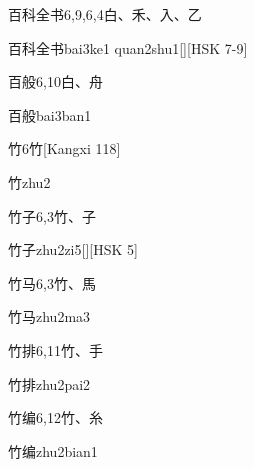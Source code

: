\begin{Entry}{百科全书}{6,9,6,4}{⽩、⽲、⼊、⼄}
  \begin{Phonetics}{百科全书}{bai3ke1 quan2shu1}[][HSK 7-9]
  \end{Phonetics}
\end{Entry}

\begin{Entry}{百般}{6,10}{⽩、⾈}
  \begin{Phonetics}{百般}{bai3ban1}
  \end{Phonetics}
\end{Entry}

\begin{Entry}{竹}{6}{⽵}[Kangxi 118]
  \begin{Phonetics}{竹}{zhu2}
  \end{Phonetics}
\end{Entry}

\begin{Entry}{竹子}{6,3}{⽵、⼦}
  \begin{Phonetics}{竹子}{zhu2zi5}[][HSK 5]
  \end{Phonetics}
\end{Entry}

\begin{Entry}{竹马}{6,3}{⽵、⾺}
  \begin{Phonetics}{竹马}{zhu2ma3}
  \end{Phonetics}
\end{Entry}

\begin{Entry}{竹排}{6,11}{⽵、⼿}
  \begin{Phonetics}{竹排}{zhu2pai2}
  \end{Phonetics}
\end{Entry}

\begin{Entry}{竹编}{6,12}{⽵、⽷}
  \begin{Phonetics}{竹编}{zhu2bian1}
  \end{Phonetics}
\end{Entry}

